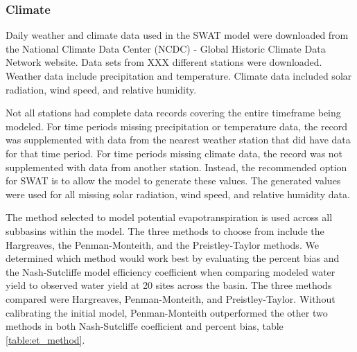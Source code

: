 \subsubsection{Climate}	


Daily weather and climate data used in the SWAT model were downloaded from the National Climate Data Center (NCDC) - Global Historic Climate Data Network website.  Data sets from XXX different stations were downloaded.  Weather data include precipitation and temperature.  Climate data included solar radiation, wind speed, and relative humidity.  

Not all stations had complete data records covering the entire timeframe being modeled.  For time periods missing precipitation or temperature data, the record was supplemented with data from the nearest weather station that did have data for that time period.  For time periods missing climate data, the record was not supplemented with data from another station.  Instead, the recommended option for SWAT is to allow the model to generate these values.  The generated values were used for all missing solar radiation, wind speed, and relative humidity data. 

The method selected to model potential evapotranspiration is used across all subbasins within the model.  The three methods to choose from include the Hargreaves, the Penman-Monteith, and the Preistley-Taylor methods.  We determined which method would work best by evaluating the percent bias and the Nash-Sutcliffe model efficiency coefficient  when comparing modeled water yield to observed water yield at 20 sites across the basin. The three methods compared were Hargreaves, Penman-Monteith, and Preistley-Taylor. Without calibrating the initial model, Penman-Monteith outperformed the other two methods in both Nash-Sutcliffe coefficient and percent bias, table \ref{table:et_method}.

